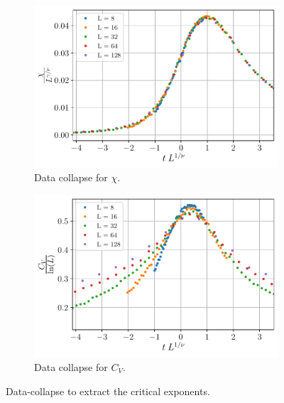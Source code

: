 \documentclass[../journal_main.tex]{subfiles}
\begin{document}
\begin{figure}[!htb]\ContinuedFloat
    \centering
    \begin{subfigure}[b]{0.49\textwidth}
        \centering
        \includegraphics[width=\textwidth]{images/data collapse/chi data collapse.pdf}
        \caption{Data collapse for $\chi$.}
        \label{chi collapse}
    \end{subfigure}
    \begin{subfigure}[b]{0.49\textwidth}
        \centering
        \includegraphics[width=\textwidth]{images/data collapse/C_v data collapse.pdf}
        \caption{Data collapse for $C_V$.}
        \label{C_V collapse}
    \end{subfigure}
    \caption{Data-collapse to extract the critical exponents.}
    \label{datacollapse}
\end{figure}
\end{document}
